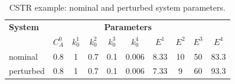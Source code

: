 \documentclass{article}
\begin{document}
\begin{table}%
\begin{center}
\begin{tabular}{l | c  c  c  c c c c c c}
 \hspace*{-0.15cm} \textbf{System} \! \!  \hspace*{-0.2cm}& \multicolumn{8}{c}{\textbf{Parameters}} \\
                &\! \! \hspace*{-0.33cm} $C_{A}^0$ \! \! \hspace*{-0.2cm} &\! \! \hspace*{-0.33cm} $k_{0}^{1}$ \! \! & \! \! \hspace*{-0.33cm} $k_{0}^{2}$ & \! \! \hspace*{-0.33cm} $k_{0}^{3}$ & \! \! \hspace*{-0.33cm} $k_{0}^{4}$ & \! \! \hspace*{-0.33cm} $E^{1}$ & \! \! \hspace*{-0.33cm} $E^{2}$ & \! \! \hspace*{-0.33cm} $E^{3}$ & $E^{4}$ \\ %
\hline
%
\hspace*{-0.15cm} nominal   \!\!  \hspace*{-0.2cm}    &\! \! \hspace*{-0.33cm} 0.8 \! \! \hspace*{-0.2cm}  & \! \! \hspace*{-0.33cm} 1 \! \!  & \! \! \hspace*{-0.33cm} 0.7& \! \! \hspace*{-0.33cm} 0.1 & \! \! \hspace*{-0.33cm} 0.006 & \! \! \hspace*{-0.33cm}  8.33 & \! \! \hspace*{-0.33cm} 10 & \! \! \hspace*{-0.33cm} 50 & \! \! \hspace*{-0.33cm} 83.3 \\
%
\hspace*{-0.15cm} perturbed \!\!  \hspace*{-0.2cm}    &\! \! \hspace*{-0.33cm} 0.8 \! \! \hspace*{-0.2cm} & \! \! \hspace*{-0.33cm} 1 \! \!  & \! \! \hspace*{-0.33cm} 0.7& \! \! \hspace*{-0.33cm} 0.1 & \! \! \hspace*{-0.33cm} 0.006 & \! \! \hspace*{-0.33cm} 7.33 & \! \! \hspace*{-0.33cm}  9 & \! \! \hspace*{-0.33cm} 60 & \! \! \hspace*{-0.33cm} 93.3 \\
\hline
\end{tabular}
\caption{CSTR example: nominal and perturbed system parameters.}
\label{tab:CSTR_coefficients}
\end{center}
\end{table}
\end{document}
